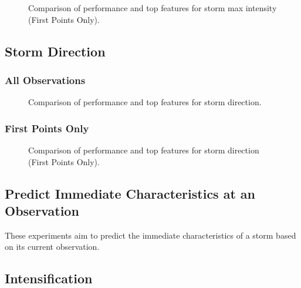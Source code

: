 \begin{figure}[h]
    \centering
    \caption{Comparison of performance and top features for storm max intensity (First Points Only).}
    \label{fig:storm_max_intensity_first_points_summary}
\end{figure}

\subsection{Storm Direction}

\subsubsection{All Observations}

\begin{figure}[h]
    \centering
    \caption{Comparison of performance and top features for storm direction.}
    \label{fig:storm_direction_summary}
\end{figure}

\subsubsection{First Points Only}

\begin{figure}[h]
    \centering
    \caption{Comparison of performance and top features for storm direction (First Points Only).}
    \label{fig:storm_direction_first_points_summary}
\end{figure}

\subsection{Predict Immediate Characteristics at an Observation}

These experiments aim to predict the immediate characteristics of a storm based on its current observation.

\subsection{Intensification}


